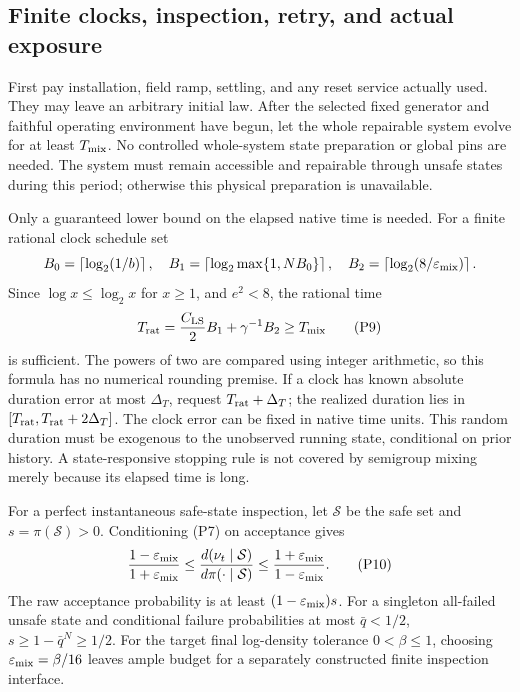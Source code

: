 \subsection{Finite clocks, inspection, retry, and actual exposure}

First pay installation, field ramp, settling, and any reset service actually
used. They may leave an arbitrary initial law. After the selected fixed
generator and faithful operating environment have begun, let the whole
repairable system evolve for at least \(T_{\rm mix}\).
No controlled whole-system state preparation or global pins are needed.
The system must remain accessible and repairable through unsafe states
during this period; otherwise this physical preparation is unavailable.

Only a guaranteed lower bound on the elapsed native time is needed.
For a finite rational clock schedule set
\[
 B_0=\left\lceil\log_2(1/b)\right\rceil,\quad
 B_1=\left\lceil\log_2\max\{1,NB_0\}\right\rceil,\quad
 B_2=\left\lceil\log_2(8/\varepsilon_{\rm mix})\right\rceil.
\]
Since \(\log x\le\log_2x\) for \(x\ge1\), and \(e^2<8\), the
rational time
\[
 T_{\rm rat}=\frac{C_{\rm LS}}2 B_1+\gamma^{-1}B_2
 \ge T_{\rm mix}                                                   \tag{P9}
\]
is sufficient. The powers of two are compared using integer arithmetic,
so this formula has no numerical rounding premise.
If a clock has known absolute duration error at most \(\Delta_T\),
request \(T_{\rm rat}+\Delta_T\); the realized duration lies in
\([T_{\rm rat},T_{\rm rat}+2\Delta_T]\).
The clock error can be fixed in native time units. This random duration
must be exogenous to the unobserved running state, conditional on prior
history. A state-responsive stopping rule is not covered by semigroup
mixing merely because its elapsed time is long.

For a perfect instantaneous safe-state inspection, let
\(\mathcal S\) be the safe set and \(s=\pi(\mathcal S)>0\).
Conditioning (P7) on acceptance gives
\[
 \frac{1-\varepsilon_{\rm mix}}{1+\varepsilon_{\rm mix}}
 \le
 \frac{d(\nu_t\mid\mathcal S)}{d\pi(\cdot\mid\mathcal S)}
 \le
 \frac{1+\varepsilon_{\rm mix}}{1-\varepsilon_{\rm mix}}.            \tag{P10}
\]
The raw acceptance probability is at least
\((1-\varepsilon_{\rm mix})s\).
For a singleton all-failed unsafe state and conditional failure probabilities
at most \(\bar q<1/2\), \(s\ge1-\bar q^N\ge1/2\).
For the target final log-density tolerance \(0<\beta\le1\), choosing
\(\varepsilon_{\rm mix}=\beta/16\) leaves ample budget for a separately
constructed finite inspection interface.

